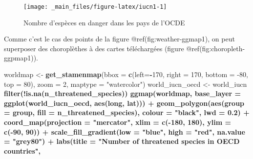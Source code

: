 \documentclass[]{book}
\newenvironment{Shaded}{\begin{snugshade}}{\end{snugshade}}
\newcommand{\DataTypeTok}[1]{\textcolor[rgb]{0.13,0.29,0.53}{#1}}
\newcommand{\DecValTok}[1]{\textcolor[rgb]{0.00,0.00,0.81}{#1}}
\newcommand{\FloatTok}[1]{\textcolor[rgb]{0.00,0.00,0.81}{#1}}
\newcommand{\KeywordTok}[1]{\textcolor[rgb]{0.13,0.29,0.53}{\textbf{#1}}}
\newcommand{\NormalTok}[1]{#1}
\newcommand{\OperatorTok}[1]{\textcolor[rgb]{0.81,0.36,0.00}{\textbf{#1}}}
\newcommand{\StringTok}[1]{\textcolor[rgb]{0.31,0.60,0.02}{#1}}
\begin{document}
\begin{figure}

{\centering \texttt{[image: \_main\_files/figure-latex/iucn1-1]} 

}

\caption{Nombre d'espèces en danger dans les pays de l'OCDE}\label{fig:iucn1}
\end{figure}

Comme c'est le cas des points de la figure @ref(fig:weather-ggmap1), on
peut superposer des choroplèthes à des cartes téléchargées (figure
@ref(fig:choropleth-ggpmap1)).

\begin{Shaded}
\begin{Highlighting}[]
\NormalTok{worldmap <-}\StringTok{ }\KeywordTok{get_stamenmap}\NormalTok{(}\DataTypeTok{bbox =} \KeywordTok{c}\NormalTok{(}\DataTypeTok{left=}\OperatorTok{-}\DecValTok{170}\NormalTok{, }\DataTypeTok{right =} \DecValTok{170}\NormalTok{, }\DataTypeTok{bottom =} \DecValTok{-80}\NormalTok{, }\DataTypeTok{top =} \DecValTok{80}\NormalTok{),}
                          \DataTypeTok{zoom =} \DecValTok{2}\NormalTok{,}
                          \DataTypeTok{maptype =} \StringTok{"watercolor"}\NormalTok{)}
\NormalTok{world_iucn_oecd <-}\StringTok{ }\NormalTok{world_iucn }\OperatorTok{%
\StringTok{  }\KeywordTok{filter}\NormalTok{(}\OperatorTok{!}\KeywordTok{is.na}\NormalTok{(n_threatened_species))}
\KeywordTok{ggmap}\NormalTok{(worldmap,}
      \DataTypeTok{base_layer =} \KeywordTok{ggplot}\NormalTok{(world_iucn_oecd, }\KeywordTok{aes}\NormalTok{(long, lat))) }\OperatorTok{+}
\StringTok{  }\KeywordTok{geom_polygon}\NormalTok{(}\KeywordTok{aes}\NormalTok{(}\DataTypeTok{group =}\NormalTok{ group, }\DataTypeTok{fill =}\NormalTok{ n_threatened_species),}
               \DataTypeTok{colour =} \StringTok{"black"}\NormalTok{, }\DataTypeTok{lwd =} \FloatTok{0.2}\NormalTok{) }\OperatorTok{+}
\StringTok{  }\KeywordTok{coord_map}\NormalTok{(}\DataTypeTok{projection =} \StringTok{"mercator"}\NormalTok{, }\DataTypeTok{xlim =} \KeywordTok{c}\NormalTok{(}\OperatorTok{-}\DecValTok{180}\NormalTok{, }\DecValTok{180}\NormalTok{), }\DataTypeTok{ylim =} \KeywordTok{c}\NormalTok{(}\OperatorTok{-}\DecValTok{90}\NormalTok{, }\DecValTok{90}\NormalTok{)) }\OperatorTok{+}
\StringTok{  }\KeywordTok{scale_fill_gradient}\NormalTok{(}\DataTypeTok{low =} \StringTok{"blue"}\NormalTok{, }\DataTypeTok{high =} \StringTok{"red"}\NormalTok{, }\DataTypeTok{na.value =} \StringTok{"grey80"}\NormalTok{) }\OperatorTok{+}
\StringTok{  }\KeywordTok{labs}\NormalTok{(}\DataTypeTok{title =} \StringTok{"Number of threatened species in OECD countries"}\NormalTok{,}
}
\end{Highlighting}
\end{Shaded}
\end{document}

